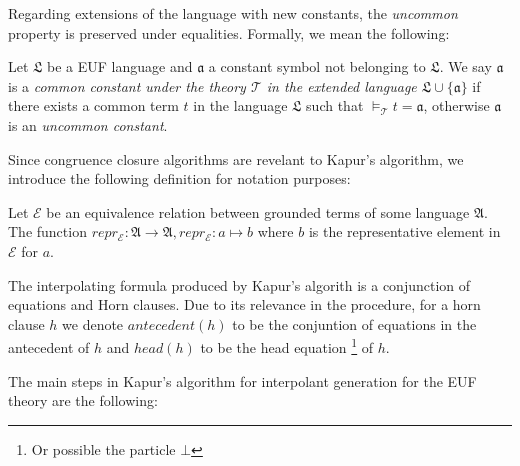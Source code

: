 Regarding extensions of the language with new constants, the \emph{uncommon} property
is preserved under equalities. Formally, we mean the following:

\begin{definition}
  Let $\mathfrak{L}$ be a EUF language and $\mathfrak{a}$ a constant symbol
  not belonging to $\mathfrak{L}$. We say $\mathfrak{a}$ is a \emph{common constant under
  the theory $\mathcal{T}$ in the extended language $\mathfrak{L} \cup \{\mathfrak{a}\}$}
  if there exists a common term $t$ in the language $\mathfrak{L}$ such that 
  $\models_{\mathcal{T}} t = \mathfrak{a}$, otherwise $\mathfrak{a}$ is an \emph{
  uncommon constant}.
\end{definition}

Since congruence closure algorithms are revelant to Kapur's algorithm, we introduce the 
following definition for notation purposes:

\begin{definition}
  Let $\mathcal{E}$ be an equivalence relation between grounded terms of some 
  language $\mathfrak{A}$. The function $repr_{\mathcal{E}} : \mathfrak{A} \rightarrow 
  \mathfrak{A} , repr_{\mathcal{E}} : a \mapsto b$  where $b$ is the representative
  element in $\mathcal{E}$ for $a$.

\end{definition}

The interpolating formula produced by Kapur's algorith is a conjunction of equations
and Horn clauses. Due to its relevance in the procedure, for a horn clause $h$
we denote $antecedent(h)$ to be the conjuntion of equations in the antecedent of $h$ 
and $head(h)$ to be the head equation \footnote{Or possible the particle $\bot$} of $h$. 

The main steps in Kapur's algorithm for interpolant generation for the EUF theory
are the following:


